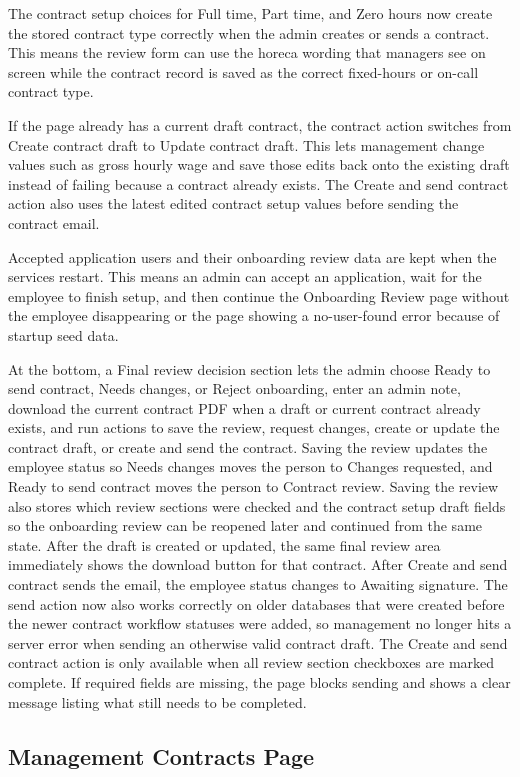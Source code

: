 \documentclass[11pt]{article}
\begin{document}
The contract setup choices for Full time, Part time, and Zero hours now create the stored contract type correctly when the admin creates or sends a contract. This means the review form can use the horeca wording that managers see on screen while the contract record is saved as the correct fixed-hours or on-call contract type.

If the page already has a current draft contract, the contract action switches from Create contract draft to Update contract draft. This lets management change values such as gross hourly wage and save those edits back onto the existing draft instead of failing because a contract already exists. The Create and send contract action also uses the latest edited contract setup values before sending the contract email.

Accepted application users and their onboarding review data are kept when the services restart. This means an admin can accept an application, wait for the employee to finish setup, and then continue the Onboarding Review page without the employee disappearing or the page showing a no-user-found error because of startup seed data.

At the bottom, a Final review decision section lets the admin choose Ready to send contract, Needs changes, or Reject onboarding, enter an admin note, download the current contract PDF when a draft or current contract already exists, and run actions to save the review, request changes, create or update the contract draft, or create and send the contract. Saving the review updates the employee status so Needs changes moves the person to Changes requested, and Ready to send contract moves the person to Contract review. Saving the review also stores which review sections were checked and the contract setup draft fields so the onboarding review can be reopened later and continued from the same state. After the draft is created or updated, the same final review area immediately shows the download button for that contract. After Create and send contract sends the email, the employee status changes to Awaiting signature. The send action now also works correctly on older databases that were created before the newer contract workflow statuses were added, so management no longer hits a server error when sending an otherwise valid contract draft. The Create and send contract action is only available when all review section checkboxes are marked complete. If required fields are missing, the page blocks sending and shows a clear message listing what still needs to be completed.
\subsection{Management Contracts Page}
\end{document}
